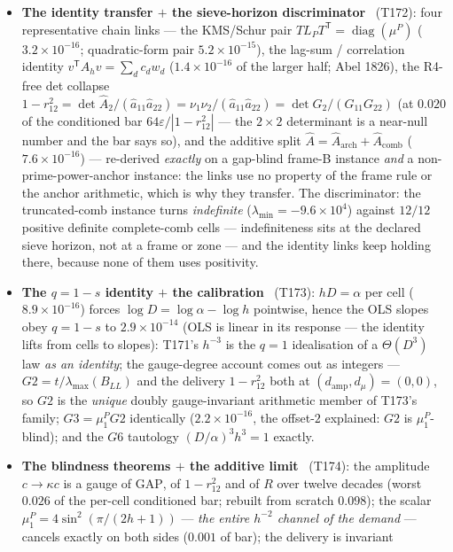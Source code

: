 \documentclass[11pt,a4paper]{article}
\begin{document}
\begin{itemize}[leftmargin=1.5em]
\item \textbf{The identity transfer $+$ the sieve-horizon discriminator} \mE\ (T172):
four representative chain links --- the KMS/Schur pair
$TL_PT^{\mathsf T}=\operatorname{diag}(\mu^P)$ ($3.2\times10^{-16}$; quadratic-form pair
$5.2\times10^{-15}$), the lag-sum / correlation identity $v^{\mathsf T}A_hv=\sum_dc_dw_d$
($1.4\times10^{-16}$ of the larger half; Abel 1826), the R4-free det collapse
$1-r_{12}^2=\det\hat A_2/(\hat a_{11}\hat a_{22})=\nu_1\nu_2/(\hat a_{11}\hat a_{22})
=\det G_2/(G_{11}G_{22})$ (at $0.020$ of the conditioned bar $64\varepsilon/|1-r_{12}^2|$
--- the $2\times2$ determinant is a near-null number and the bar says so), and the
additive split $\hat A=\hat A_{\mathrm{arch}}+\hat A_{\mathrm{comb}}$
($7.6\times10^{-16}$) --- re-derived \emph{exactly} on a gap-blind frame-B instance
\emph{and} a non-prime-power-anchor instance: the links use no property of the frame rule
or the anchor arithmetic, which is why they transfer. The discriminator: the
truncated-comb instance turns \emph{indefinite} ($\lambda_{\min}=-9.6\times10^{4}$)
against $12/12$ positive definite complete-comb cells --- indefiniteness sits at the
declared sieve horizon, not at a frame or zone --- and the identity links keep holding
there, because none of them uses positivity.
\item \textbf{The $q=1-s$ identity $+$ the calibration} \mE\ (T173): $hD=\alpha$ per cell
($8.9\times10^{-16}$) forces $\log D=\log\alpha-\log h$ pointwise, hence the OLS slopes
obey $q=1-s$ to $2.9\times10^{-14}$ (OLS is linear in its response --- the identity lifts
from cells to slopes): T171's $h^{-3}$ is the $q=1$ idealisation of a $\Theta(D^3)$ law
\emph{as an identity}; the gauge-degree account comes out as integers ---
$G2=t/\lambda_{\max}(B_{LL})$ and the delivery $1-r_{12}^2$ both at
$(d_{\mathrm{amp}},d_\mu)=(0,0)$, so $G2$ is the \emph{unique} doubly gauge-invariant
arithmetic member of T173's family; $G3=\mu^P_1G2$ identically ($2.2\times10^{-16}$, the
offset-$2$ explained: $G2$ is $\mu^P_1$-blind); and the $G6$ tautology
$(D/\alpha)^3h^3=1$ exactly.
\item \textbf{The blindness theorems $+$ the additive limit} \mE\ (T174): the amplitude
$c\to\kappa c$ is a gauge of $\mathrm{GAP}$, of $1-r_{12}^2$ and of $R$ over twelve
decades (worst $0.026$ of the per-cell conditioned bar; rebuilt from scratch $0.098$);
the scalar $\mu^P_1=4\sin^2(\pi/(2h+1))$ --- \emph{the entire $h^{-2}$ channel of the
demand} --- cancels exactly on both sides ($0.001$ of bar); the delivery is invariant

\end{itemize}
\end{document}
